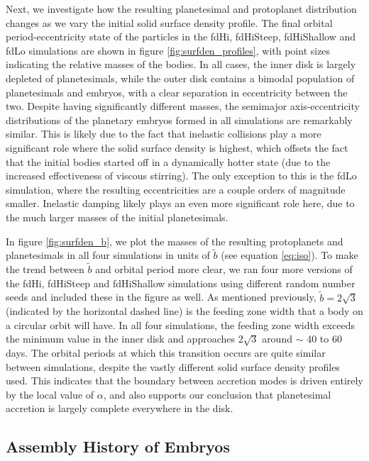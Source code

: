 \documentclass[twocolumn,linenumbers]{aastex63}
\begin{document}
Next, we investigate how the resulting planetesimal and protoplanet distribution
changes as we vary the initial solid surface density profile.
The final orbital period-eccentricity state of the
particles in the fdHi, fdHiSteep, fdHiShallow and fdLo simulations are shown in figure \ref{fig:surfden_profiles}, with point sizes 
indicating the relative masses of the bodies. In all cases, the inner disk is largely depleted of planetesimals, while the outer disk 
contains a bimodal population of planetesimals and embryos, with a clear separation in eccentricity between the two. Despite 
having significantly different masses, the semimajor axis-eccentricity distributions of the planetary embryos formed in all simulations are remarkably similar. This 
is likely due to the fact that inelastic collisions play a more significant role where the solid surface density is highest, which 
offsets the fact that the initial bodies started off in a dynamically hotter state (due to the increased effectiveness of viscous stirring). The only exception to this is the fdLo simulation, 
where the resulting eccentricities are a couple orders of magnitude smaller. Inelastic damping likely plays an even more 
significant role here, due to the much larger masses of the initial planetesimals.

In figure \ref{fig:surfden_b}, we plot the masses of the resulting protoplanets and planetesimals in all four simulations in units of $
\tilde{b}$ (see equation \ref{eq:iso}). To make the trend between $\tilde{b}$ and orbital period more clear, we ran four more versions of the fdHi, fdHiSteep and fdHiShallow simulations using different random number seeds and included these in the figure as well.
As mentioned previously, $\tilde{b} = 2 \sqrt{3}$ (indicated by the horizontal dashed line) is the  
feeding zone width that a body on a circular orbit will have. In all four simulations, the feeding zone width exceeds the 
minimum value in the inner disk and approaches $2 \sqrt{3}$ around $\sim$ 40 to 60 days. The orbital periods at which this transition 
occurs are quite similar between simulations, despite the vastly different solid surface density profiles used. This indicates that 
the boundary between accretion modes is driven entirely by the local value of $\alpha$, and also supports our 
conclusion that planetesimal accretion is largely complete everywhere in the disk.

\subsection{Assembly History of Embryos}\label{sec:assembly}
\end{document}
